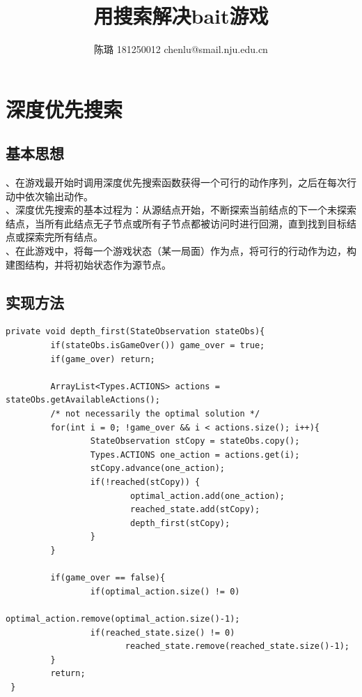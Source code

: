 \documentclass[UTF8]{article}
\begin{document}
\title{用搜索解决bait游戏}
\author{陈璐 181250012 chenlu@smail.nju.edu.cn}

\maketitle

\tableofcontents

\section{深度优先搜索}

\subsection{基本思想}
、在游戏最开始时调用深度优先搜索函数获得一个可行的动作序列，之后在每次行动中依次输出动作。\\
、深度优先搜索的基本过程为：从源结点开始，不断探索当前结点的下一个未探索结点，当所有此结点无子节点或所有子节点都被访问时进行回溯，直到找到目标结点或探索完所有结点。\\
、在此游戏中，将每一个游戏状态（某一局面）作为点，将可行的行动作为边，构建图结构，并将初始状态作为源节点。

\subsection{实现方法}

\begin{lstlisting}[caption=深度优先搜索]
 private void depth_first(StateObservation stateObs){
		 if(stateObs.isGameOver()) game_over = true;
		 if(game_over) return;
		 
		 ArrayList<Types.ACTIONS> actions = stateObs.getAvailableActions();
		 /* not necessarily the optimal solution */
		 for(int i = 0; !game_over && i < actions.size(); i++){
				 StateObservation stCopy = stateObs.copy();
				 Types.ACTIONS one_action = actions.get(i);
				 stCopy.advance(one_action);
				 if(!reached(stCopy)) {
						 optimal_action.add(one_action);
						 reached_state.add(stCopy);
						 depth_first(stCopy);
				 }
		 }
		 
		 if(game_over == false){
				 if(optimal_action.size() != 0)
						optimal_action.remove(optimal_action.size()-1);
				 if(reached_state.size() != 0)
				 		reached_state.remove(reached_state.size()-1);
		 }
		 return;
 }
\end{lstlisting}
\end{document}
